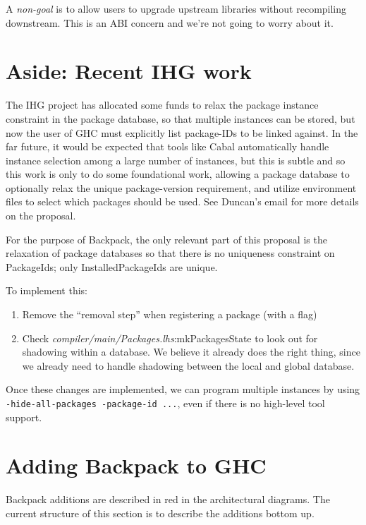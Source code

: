 \documentclass{article}
\newcommand{\ghcfile}[1]{\textsl{#1}}
\begin{document}
A \emph{non-goal} is to allow users to upgrade upstream libraries
without recompiling downstream. This is an ABI concern and we're not
going to worry about it.

\section{Aside: Recent IHG work}\label{sec:ihg}

The IHG project has allocated some funds to relax the package instance
constraint in the package database, so that multiple instances can be
stored, but now the user of GHC must explicitly list package-IDs to be
linked against.  In the far future, it would be expected that tools like
Cabal automatically handle instance selection among a large number of
instances, but this is subtle and so this work is only to do some
foundational work, allowing a package database to optionally relax the
unique package-version requirement, and utilize environment files to
select which packages should be used.  See Duncan's email for more
details on the proposal.

For the purpose of Backpack, the only relevant part of this proposal
is the relaxation of package databases so that there is no uniqueness
constraint on PackageIds; only InstalledPackageIds are unique.

To implement this:

\begin{enumerate}

    \item Remove the ``removal step'' when registering a package (with a flag)

    \item Check \ghcfile{compiler/main/Packages.lhs}:mkPackagesState to look out for shadowing
      within a database. We believe it already does the right thing, since
      we already need to handle shadowing between the local and global database.

\end{enumerate}

Once these changes are implemented, we can program multiple instances by
using \verb|-hide-all-packages -package-id ...|, even if there is no
high-level tool support.

\section{Adding Backpack to GHC}

Backpack additions are described in red in the architectural diagrams.
The current structure of this section is to describe the additions bottom up.
\end{document}

